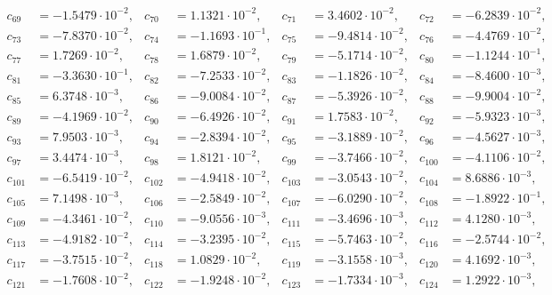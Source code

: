 \begin{align*}
c_{ 69 } &= -1.5479 \cdot 10^{ -2 }, & c_{ 70 } &= 1.1321 \cdot 10^{ -2 }, & c_{ 71 } &= 3.4602 \cdot 10^{ -2 }, & c_{ 72 } &= -6.2839 \cdot 10^{ -2 },\\ 
c_{ 73 } &= -7.8370 \cdot 10^{ -2 }, & c_{ 74 } &= -1.1693 \cdot 10^{ -1 }, & c_{ 75 } &= -9.4814 \cdot 10^{ -2 }, & c_{ 76 } &= -4.4769 \cdot 10^{ -2 },\\ 
c_{ 77 } &= 1.7269 \cdot 10^{ -2 }, & c_{ 78 } &= 1.6879 \cdot 10^{ -2 }, & c_{ 79 } &= -5.1714 \cdot 10^{ -2 }, & c_{ 80 } &= -1.1244 \cdot 10^{ -1 },\\ 
c_{ 81 } &= -3.3630 \cdot 10^{ -1 }, & c_{ 82 } &= -7.2533 \cdot 10^{ -2 }, & c_{ 83 } &= -1.1826 \cdot 10^{ -2 }, & c_{ 84 } &= -8.4600 \cdot 10^{ -3 },\\ 
c_{ 85 } &= 6.3748 \cdot 10^{ -3 }, & c_{ 86 } &= -9.0084 \cdot 10^{ -2 }, & c_{ 87 } &= -5.3926 \cdot 10^{ -2 }, & c_{ 88 } &= -9.9004 \cdot 10^{ -2 },\\ 
c_{ 89 } &= -4.1969 \cdot 10^{ -2 }, & c_{ 90 } &= -6.4926 \cdot 10^{ -2 }, & c_{ 91 } &= 1.7583 \cdot 10^{ -2 }, & c_{ 92 } &= -5.9323 \cdot 10^{ -3 },\\ 
c_{ 93 } &= 7.9503 \cdot 10^{ -3 }, & c_{ 94 } &= -2.8394 \cdot 10^{ -2 }, & c_{ 95 } &= -3.1889 \cdot 10^{ -2 }, & c_{ 96 } &= -4.5627 \cdot 10^{ -3 },\\ 
c_{ 97 } &= 3.4474 \cdot 10^{ -3 }, & c_{ 98 } &= 1.8121 \cdot 10^{ -2 }, & c_{ 99 } &= -3.7466 \cdot 10^{ -2 }, & c_{ 100 } &= -4.1106 \cdot 10^{ -2 },\\ 
c_{ 101 } &= -6.5419 \cdot 10^{ -2 }, & c_{ 102 } &= -4.9418 \cdot 10^{ -2 }, & c_{ 103 } &= -3.0543 \cdot 10^{ -2 }, & c_{ 104 } &= 8.6886 \cdot 10^{ -3 },\\ 
c_{ 105 } &= 7.1498 \cdot 10^{ -3 }, & c_{ 106 } &= -2.5849 \cdot 10^{ -2 }, & c_{ 107 } &= -6.0290 \cdot 10^{ -2 }, & c_{ 108 } &= -1.8922 \cdot 10^{ -1 },\\ 
c_{ 109 } &= -4.3461 \cdot 10^{ -2 }, & c_{ 110 } &= -9.0556 \cdot 10^{ -3 }, & c_{ 111 } &= -3.4696 \cdot 10^{ -3 }, & c_{ 112 } &= 4.1280 \cdot 10^{ -3 },\\ 
c_{ 113 } &= -4.9182 \cdot 10^{ -2 }, & c_{ 114 } &= -3.2395 \cdot 10^{ -2 }, & c_{ 115 } &= -5.7463 \cdot 10^{ -2 }, & c_{ 116 } &= -2.5744 \cdot 10^{ -2 },\\ 
c_{ 117 } &= -3.7515 \cdot 10^{ -2 }, & c_{ 118 } &= 1.0829 \cdot 10^{ -2 }, & c_{ 119 } &= -3.1558 \cdot 10^{ -3 }, & c_{ 120 } &= 4.1692 \cdot 10^{ -3 },\\ 
c_{ 121 } &= -1.7608 \cdot 10^{ -2 }, & c_{ 122 } &= -1.9248 \cdot 10^{ -2 }, & c_{ 123 } &= -1.7334 \cdot 10^{ -3 }, & c_{ 124 } &= 1.2922 \cdot 10^{ -3 },\\ 

\end{align*}
